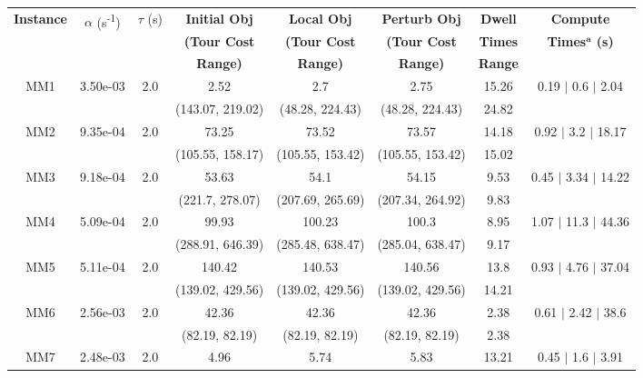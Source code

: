 \begin{longtable}{|c|c|c|c|c|c|c|c|}\hline
	\multirow{3}{*}{\textbf{Instance}} & \multirow{3}{*}{$\alpha$ (s\textsuperscript{-1})} & \multirow{3}{*}{$\tau$ (s)} & {\textbf{Initial Obj}} & {\textbf{Local Obj}} & {\textbf{Perturb Obj}} & {\textbf{Dwell}} & {\textbf{Compute}} \\
	 & & & {\textbf{(Tour Cost}} & {\textbf{(Tour Cost}} & {\textbf{(Tour Cost}} & {\textbf{Times}} & {\textbf{Times$^{\mathrm{\boldsymbol{a}}}$ (s)}} \\
	 & & & {\textbf{Range)}} & {\textbf{Range)}} & {\textbf{Range)}} & {\textbf{Range}} & \\
	\hline \hline
	\multirow{2}{*}{MM1} & \multirow{2}{*}{3.50e-03} & \multirow{2}{*}{2.0} & 2.52 & 2.7 & 2.75 & 15.26 & 0.19 $\mid$ 0.6 $\mid$ 2.04\\
	 &  &  & (143.07, 219.02) & (48.28, 224.43) & (48.28, 224.43) & 24.82 & \\
 	\hline
	\multirow{2}{*}{MM2} & \multirow{2}{*}{9.35e-04} & \multirow{2}{*}{2.0} & 73.25 & 73.52 & 73.57 & 14.18 & 0.92 $\mid$ 3.2 $\mid$ 18.17\\
	 &  &  & (105.55, 158.17) & (105.55, 153.42) & (105.55, 153.42) & 15.02 & \\
 	\hline
	\multirow{2}{*}{MM3} & \multirow{2}{*}{9.18e-04} & \multirow{2}{*}{2.0} & 53.63 & 54.1 & 54.15 & 9.53 & 0.45 $\mid$ 3.34 $\mid$ 14.22\\
	 &  &  & (221.7, 278.07) & (207.69, 265.69) & (207.34, 264.92) & 9.83 & \\
 	\hline
	\multirow{2}{*}{MM4} & \multirow{2}{*}{5.09e-04} & \multirow{2}{*}{2.0} & 99.93 & 100.23 & 100.3 & 8.95 & 1.07 $\mid$ 11.3 $\mid$ 44.36\\
	 &  &  & (288.91, 646.39) & (285.48, 638.47) & (285.04, 638.47) & 9.17 & \\
 	\hline
	\multirow{2}{*}{MM5} & \multirow{2}{*}{5.11e-04} & \multirow{2}{*}{2.0} & 140.42 & 140.53 & 140.56 & 13.8 & 0.93 $\mid$ 4.76 $\mid$ 37.04\\
	 &  &  & (139.02, 429.56) & (139.02, 429.56) & (139.02, 429.56) & 14.21 & \\
 	\hline
	\multirow{2}{*}{MM6} & \multirow{2}{*}{2.56e-03} & \multirow{2}{*}{2.0} & 42.36 & 42.36 & 42.36 & 2.38 & 0.61 $\mid$ 2.42 $\mid$ 38.6\\
	 &  &  & (82.19, 82.19) & (82.19, 82.19) & (82.19, 82.19) & 2.38 & \\
 	\hline
	\multirow{2}{*}{MM7} & \multirow{2}{*}{2.48e-03} & \multirow{2}{*}{2.0} & 4.96 & 5.74 & 5.83 & 13.21 & 0.45 $\mid$ 1.6 $\mid$ 3.91\\

\end{longtable}
